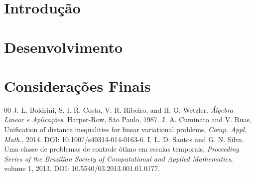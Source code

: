 \documentclass[a4paper, 12pt]{article}
\begin{document}
	\section{Introdução}   %
	\lipsum[2]
	\section{Desenvolvimento}
	\lipsum[3-6]	
	\section{Considerações Finais}
	\lipsum[7]
	\begin{thebibliography}{00} \footnotesize
		J. L. Boldrini, S. I. R. Costa, V. R. Ribeiro, and H. G. Wetzler. {\it Álgebra Linear e Aplicações}. Harper-Row, São Paulo, 1987.
		J. A. Cuminato and V. Ruas, Unification of distance inequalities for linear variational problems, {\it Comp. Appl. Math.}, 2014. DOI: 10.1007/s40314-014-0163-6.
		I. L. D. Santos and  G. N. Silva. Uma classe de problemas de controle ótimo em escalas temporais, {\it Proceeding Series of the Brazilian Society of Computational and Applied Mathematics}, volume 1, 2013. DOI: 10.5540/03.2013.001.01.0177.
	\end{thebibliography}
\end{document}
